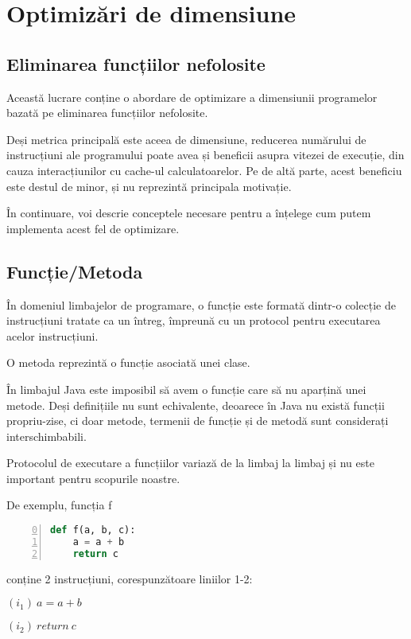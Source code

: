 \chapter{Optimizări de dimensiune}\label{capitolul_optimizari_de_dimensiune}

\section{Eliminarea funcțiilor nefolosite}

Această lucrare conține o abordare de optimizare a dimensiunii
programelor bazată pe eliminarea funcțiilor nefolosite.

Deși metrica principală este aceea de dimensiune, reducerea
numărului de instrucțiuni ale programului poate avea și beneficii
asupra vitezei de execuție, din cauza interacțiunilor cu cache-ul
calculatoarelor. Pe de altă parte, acest beneficiu este destul de
minor, și nu reprezintă principala motivație.

În continuare, voi descrie conceptele necesare pentru a înțelege
cum putem implementa acest fel de optimizare.

\section{Funcție/Metoda}

În domeniul limbajelor de programare, o funcție  este
formată dintr-o colecție de instrucțiuni tratate ca un întreg,
împreună cu un protocol pentru executarea acelor instrucțiuni.

O metoda  reprezintă o funcție asociată unei clase.

În limbajul Java este imposibil să avem o funcție care să nu
aparțină unei metode.
Deși definițiile nu sunt echivalente, deoarece în Java nu există
funcții propriu-zise, ci doar metode, termenii de funcție și de metodă
sunt considerați interschimbabili.

Protocolul de executare a funcțiilor variază de la limbaj la
limbaj și nu este important pentru scopurile noastre.

De exemplu, funcția f
\begin{lstlisting}[language=Python, numbers=left, firstnumber=0]
def f(a, b, c):
    a = a + b
    return c
\end{lstlisting}
conține 2 instrucțiuni, corespunzătoare liniilor 1-2:

$(i_1)\ a = a + b$

$(i_2)\ return\ c$

